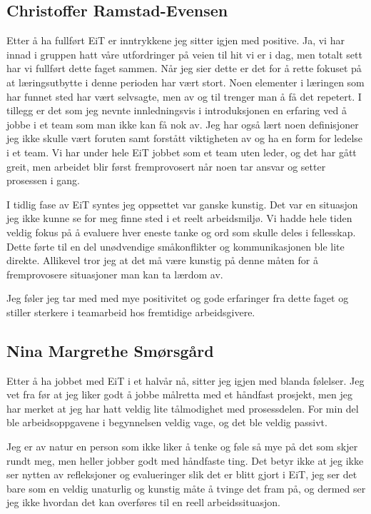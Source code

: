 \subsection*{Christoffer Ramstad-Evensen}
Etter å ha fullført EiT er inntrykkene jeg sitter igjen med positive. Ja, vi har innad i gruppen hatt våre utfordringer
på veien til hit vi er i dag, men totalt sett har vi fullført dette faget sammen. Når jeg sier dette er det for å rette 
fokuset på at læringsutbytte i denne perioden har vært stort. Noen elementer i læringen som har funnet sted
har vært selvsagte, men av og til trenger man å få det repetert. I tillegg er det som jeg nevnte innledningsvis
i introduksjonen en erfaring ved å jobbe i et team som man ikke kan få nok av. Jeg har også lært noen 
definisjoner jeg ikke skulle vært foruten samt forstått viktigheten av og ha en form for ledelse i et team. 
Vi har under hele EiT jobbet som et team uten leder, og det har gått greit, men arbeidet blir først fremprovosert
når noen tar ansvar og setter prosessen i gang. 

I tidlig fase av EiT syntes jeg oppsettet var ganske kunstig. Det var en situasjon jeg ikke kunne se for meg
finne sted i et reelt arbeidsmiljø. Vi hadde hele tiden veldig fokus på å evaluere hver eneste tanke og ord som
skulle deles i fellesskap. Dette førte til en del unødvendige småkonflikter og kommunikasjonen ble lite direkte. 
Allikevel tror jeg at det må være kunstig på denne måten for å fremprovosere situasjoner man kan ta lærdom av.

Jeg føler jeg tar med med mye positivitet og gode erfaringer fra dette faget og stiller sterkere i teamarbeid hos
fremtidige arbeidsgivere.

\subsection*{Nina Margrethe Smørsgård}
Etter å ha jobbet med EiT i et halvår nå, sitter jeg igjen med blanda følelser. 
Jeg vet fra før at jeg liker godt å jobbe målretta med et håndfast prosjekt, men jeg 
har merket at jeg har hatt veldig lite tålmodighet med prosessdelen. For 
min del ble arbeidsoppgavene i begynnelsen veldig vage, og det ble veldig passivt.

Jeg er av natur en person som ikke liker å tenke og føle så mye på det som skjer 
rundt meg, men heller jobber godt med håndfaste ting. Det betyr ikke at jeg ikke ser 
nytten av refleksjoner og evalueringer slik det er blitt gjort i EiT, jeg ser det 
bare som en veldig unaturlig og kunstig måte å tvinge det fram på, og dermed ser 
jeg ikke hvordan det kan overføres til en reell arbeidssituasjon.

